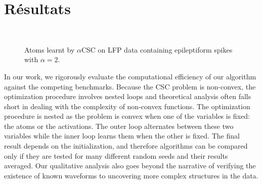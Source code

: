 \section*{Résultats}
\begin{figure}[htb]
    \centering
              \\

            \caption[]{Atoms learnt by $\alpha$CSC on LFP data containing epileptiform spikes with $\alpha=2$.}
            \label{fig:sommaire:spikedata}
\end{figure}

In our work, we rigorously evaluate the computational efficiency of our algorithm against the competing benchmarks. Because the \ac{CSC} problem is non-convex, the optimization procedure involves nested loops and theoretical analysis often falls short in dealing with the complexity of non-convex functions. 
The optimization procedure is nested as the problem is convex when one of the variables is fixed: the atoms or the activations. The outer loop alternates between these two variables while the inner loop learns them when the other is fixed. The final result depends on the initialization, and therefore algorithms can be compared only if they are tested for many different random seeds and their results averaged. Our qualitative analysis also goes beyond the narrative of verifying the existence of known waveforms to uncovering more complex structures in the data.

